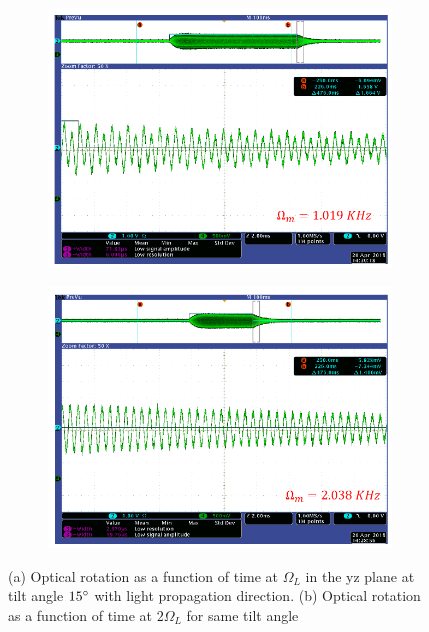 \begin{figure}
    \centering
 
    \begin{subfigure}[b]{0.45\textwidth}
        \centering
        \includegraphics[width=\textwidth]{figures/transversefield_2.png}
        \caption{}
        \label{fig:transverse}
    \end{subfigure}
    \hfill
    \begin{subfigure}[b]{0.45\textwidth}
        \centering
        \includegraphics[width=\textwidth]{figures/transversefield}
        \caption{}
        \label{fig:transverse2}
    \end{subfigure}
    \caption{(a) Optical rotation as a function of time at $\Omega_L$ in the yz plane at tilt angle $15\degree$ with light propagation direction. (b) Optical rotation as a function of time at $2\Omega_L$ for same tilt angle}
    \label{fig:Tilted field}
\end{figure}

